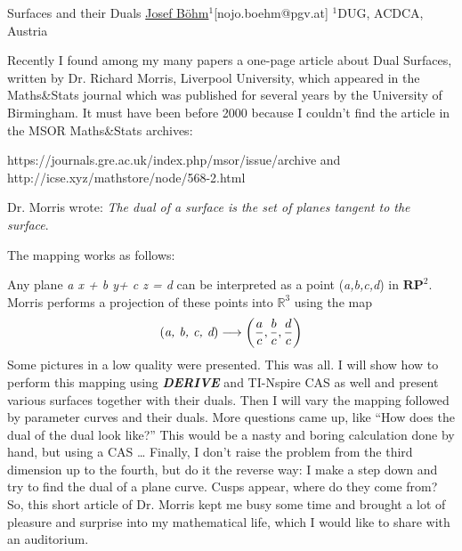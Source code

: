 


\begin{abstract_online}{Surfaces and their Duals}{%
        \underline{Josef B\"{o}hm}$^{1}$}{[nojo.boehm@pgv.at]
        }{%
        $^1$DUG, ACDCA, Austria}
    
Recently I found among my many papers a one-page article about Dual Surfaces, written by Dr. Richard Morris, Liverpool University, which appeared in the Maths\&Stats journal which was published for several years by the University of Birmingham. It must have been before 2000 because I couldn’t find the article in the MSOR Maths\&Stats archives:

https://journals.gre.ac.uk/index.php/msor/issue/archive and http://icse.xyz/mathstore/node/568-2.html

Dr. Morris wrote: \emph{The dual of a surface is the set of planes tangent to the surface}.

The mapping works as follows:

Any plane  \emph{a x + b y+ c z = d} can be interpreted as a point  (\emph{a,b,c,d}) in $\textbf{RP}^2$. Morris performs a projection of these points into $\mathbb{R}^3$ using the map
\begin{equation}
 (\emph{a, b, c, d}) \longrightarrow \left(\frac{a}{c} , \frac{b}{c} , \frac{d}{c}\right)
\end{equation}
Some pictures in a low quality were presented. This was all.
I will show how to perform this mapping using  \textbf{\emph{DERIVE}} and TI-Nspire CAS as well and present various surfaces together with their duals.
Then I will vary the mapping followed by parameter curves and their duals. More questions came up, like “How does the dual of the dual look like?” This would be a nasty and boring calculation done by hand, but using a CAS …
Finally, I don’t raise the problem from the third dimension up to the fourth, but do it the reverse way: 
I make a step down and try to find the dual of a plane curve. Cusps appear, where do they come from?
So, this short article of Dr. Morris kept me busy some time and brought a lot of pleasure and surprise into my mathematical life, which I would like to share with an auditorium.







\end{abstract_online}
